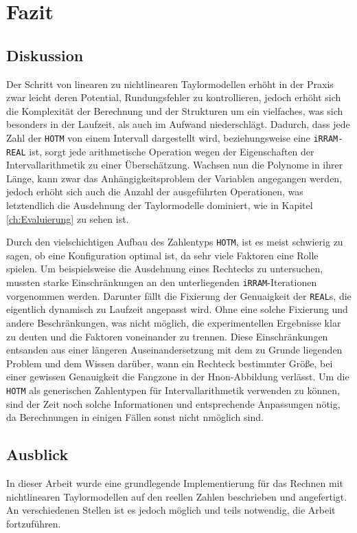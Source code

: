 
\chapter{Fazit}
\label{ch:fazit}

\section{Diskussion}
Der Schritt von linearen zu nichtlinearen Taylormodellen erhöht in der Praxis zwar leicht deren Potential, Rundungsfehler zu kontrollieren, jedoch erhöht sich die Komplexität der Berechnung und der Strukturen um ein vielfaches, was sich besonders in der Laufzeit, als auch im Aufwand niederschlägt. Dadurch, dass jede Zahl der \verb+HOTM+ von einem Intervall dargestellt wird, beziehungsweise eine \verb+iRRAM-REAL+ ist, sorgt jede arithmetische Operation wegen der Eigenschaften der Intervallarithmetik zu einer Überschätzung. Wachsen nun die Polynome in ihrer Länge, kann zwar das Anhängigkeitsproblem der Variablen angegangen werden, jedoch erhöht sich auch die Anzahl der ausgeführten Operationen, was letztendlich die Ausdehnung der Taylormodelle dominiert, wie in Kapitel \ref{ch:Evaluierung} zu sehen ist. 

Durch den vielschichtigen Aufbau des Zahlentyps \verb+HOTM+, ist es meist schwierig zu sagen, ob eine Konfiguration optimal ist, da sehr viele Faktoren eine Rolle spielen. Um beispielsweise die Ausdehnung eines Rechtecks zu untersuchen, mussten starke Einschränkungen an den unterliegenden \verb+iRRAM+-Iterationen vorgenommen werden. Darunter fällt die Fixierung der Genuaigkeit der \verb+REAL+s, die eigentlich dynamisch zu Laufzeit angepasst wird. Ohne eine solche Fixierung und andere Beschränkungen, was nicht möglich, die experimentellen Ergebnisse klar zu deuten und die Faktoren voneinander zu trennen. Diese Einschränkungen entsanden aus einer längeren Auseinandersetzung mit dem zu Grunde liegenden Problem und dem Wissen darüber, wann ein Rechteck bestimmter Größe, bei einer gewissen Genauigkeit die Fangzone in der H\e non-Abbildung verlässt. Um die \verb+HOTM+ als generischen Zahlentypen für Intervallarithmetik verwenden zu können, sind der Zeit noch solche Informationen und entsprechende Anpassungen nötig, da Berechnungen in einigen Fällen sonst nicht nmöglich sind.


\section{Ausblick}
In dieser Arbeit wurde eine grundlegende Implementierung für das Rechnen mit nichtlinearen Taylormodellen auf den reellen Zahlen beschrieben und angefertigt. An verschiedenen Stellen ist es jedoch möglich und teils notwendig, die Arbeit fortzuführen.

